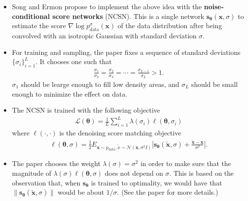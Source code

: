 \documentclass[10pt]{article}
\newcommand{\ve}[1]{\mathbf{#1}}
\newcommand{\mrm}[1]{\mathrm{#1}}
\newcommand{\ves}[1]{\boldsymbol{#1}}
\newcommand{\mcal}[1]{\mathcal{#1}}
\begin{document}
\begin{itemize}
  \item Song and Ermon propose to implement the above idea with the {\bf noise-conditional score networks} (NCSN). This is a single network $\ve{s}_{\ves{\theta}}(\ve{x}, \sigma)$ to estimate the score $\nabla \log p^\sigma_{\mrm{data}}(\ve{x})$ of the data distribution after being convolved with an isotropic Gaussian with standard deviation $\sigma$.

  \item For training and sampling, the paper fixes a sequence of standard deviations $\{ \sigma_i \}_{i=1}^L$. It chooses one such that
  \begin{align*}
    \frac{\sigma_1}{\sigma_2} = \frac{\sigma_2}{\sigma_3} = \dotsb = \frac{\sigma_{L-1}}{\sigma_L} > 1.
  \end{align*}
  $\sigma_1$ should be learge enough to fill low density areas, and $\sigma_L$ should be small enough to minimize the effect on data.

  \item The NCSN is trained with the following objective
  \begin{align*}
    \mcal{L}(\ves{\theta}) = \frac{1}{L} \sum_{i=1}^L \lambda(\sigma_i) \ell(\ves{\theta}, \sigma_i)
  \end{align*}
  where $\ell(\cdot, \cdot)$ is the denoising score matching objective
  \begin{align*}
    \ell(\ves{\theta},\sigma) = \frac{1}{2}E_{\ve{x}\sim p_{\mrm{data}}, \widetilde{x} \sim \mcal{N}(\ve{x},\sigma^2I)} \bigg[ \ve{s}_{\ves{\theta}}(\widetilde{\ve{x}},\sigma) + \frac{\widetilde{\ve{x}} - \ve{x}}{\sigma^2} \bigg].
  \end{align*}
  
  \item The paper chooses the weight $\lambda(\sigma) = \sigma^2$ in order to make sure that the magnitude of $\lambda(\sigma) \ell(\ves{\theta},\sigma)$ does not depend on $\sigma$. This is based on the observation that, when $\ve{s}_{\ves{\theta}}$ is trained to optimality, we would have that $\| \ve{s}_{\ves{\theta}}(\widetilde{\ve{x}},\sigma) \|$ would be about $1/\sigma$. (See the paper for more details.)


\end{itemize}
\end{document}
